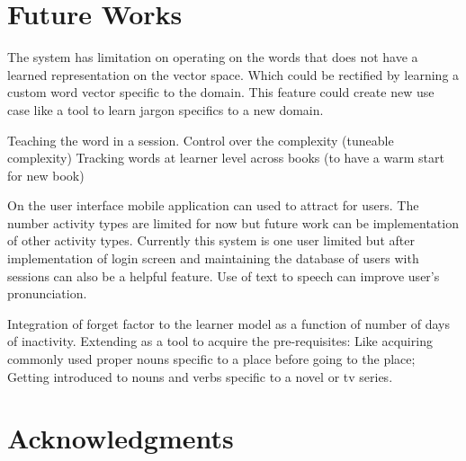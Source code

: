 \documentclass[11pt,a4paper]{article}
\begin{document}
\section{Future Works}
The system has limitation on operating on the words that does not have a learned
representation on the vector space. Which could be rectified by learning a
custom word vector specific to the domain. This feature could create new use case
like a tool to learn jargon specifics to a new domain.

Teaching the word in a session.
Control over the complexity (tuneable complexity)
Tracking words at learner level across books (to have a warm start for new book)

On the user interface mobile application can used to attract for users. The number activity types are limited for now but future work can be implementation of other activity types. Currently this system is one user limited but after implementation of login screen and maintaining the database of users with sessions can also be a helpful feature. Use of text to speech can improve user's pronunciation. 

Integration of forget factor to the learner model as a function of number of days of inactivity.
Extending as a tool to acquire the pre-requisites: Like acquiring commonly used proper nouns specific to a place before going to the place; Getting introduced to nouns and verbs specific to a novel or tv series.


\section*{Acknowledgments}



\end{document}
